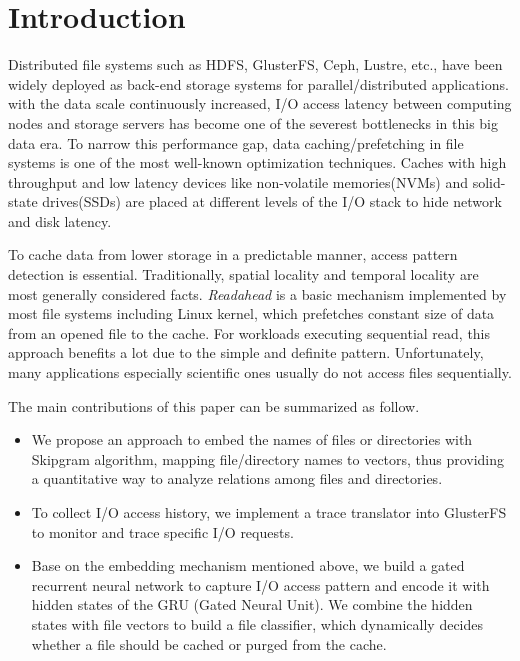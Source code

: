 \documentclass[conference]{IEEEtran}
\begin{document}
\section{Introduction}
Distributed file systems such as HDFS\cite{HDFS}, GlusterFS\cite{GlusterFS}, Ceph\cite{Ceph}, Lustre\cite{Lustre}, etc., have been widely deployed as back-end storage systems for parallel/distributed applications. with the data scale continuously increased, I/O access latency between computing nodes and storage servers has become one of the severest bottlenecks in this big data era. To narrow this performance gap, data caching/prefetching in file systems is one of the most well-known optimization techniques. Caches with high throughput and low latency devices like non-volatile memories(NVMs) and solid-state drives(SSDs) are placed at different levels of the I/O stack to hide network and disk latency.

To cache data from lower storage in a predictable manner, access pattern detection is essential. Traditionally, spatial locality and temporal locality are most generally considered facts. \textit{Readahead} is a basic mechanism implemented by most file systems\cite{WhyDoes} including Linux kernel, which prefetches constant size of data from an opened file to the cache. For workloads executing sequential read, this approach benefits a lot due to the simple and definite pattern. Unfortunately, many applications especially scientific ones usually do not access files sequentially.

The main contributions of this paper can be summarized as follow.
\begin{itemize}
    \item We propose an approach to embed the names of files or directories with Skipgram algorithm, mapping file/directory names to vectors, thus providing a quantitative way to analyze relations among files and directories.
    \item To collect I/O access history, we implement a trace translator into GlusterFS to monitor and trace specific I/O requests.
    \item Base on the embedding mechanism mentioned above, we build a gated recurrent neural network to capture I/O access pattern and encode it with hidden states of the GRU (Gated Neural Unit). We combine the hidden states with file vectors to build a file classifier, which dynamically decides whether a file should be cached or purged from the cache.

\end{itemize}
\end{document}
